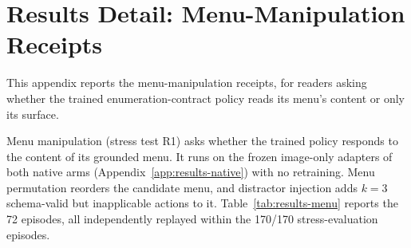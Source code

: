\section{Results Detail: Menu-Manipulation Receipts}
\label{app:results-menu}
\label{sec:results-menu}

This appendix reports the menu-manipulation receipts, for readers asking whether the trained enumeration-contract policy reads its menu's content or only its surface.

Menu manipulation (stress test R1) asks whether the trained policy responds to the content of its grounded menu. It runs on the frozen image-only adapters of both native arms (Appendix~\ref{app:results-native}) with no retraining. Menu permutation reorders the candidate menu, and distractor injection adds $k{=}3$ schema-valid but inapplicable actions to it. Table~\ref{tab:results-menu} reports the 72 episodes, all independently replayed within the 170/170 stress-evaluation episodes.

